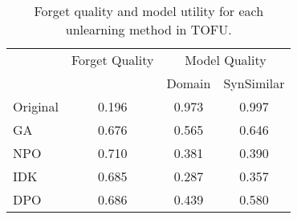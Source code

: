 \setlength{\tabcolsep}{2.5pt}
\small
\begin{table}[hbt!]
\begin{tabular}{l c c c}
\hline
 & Forget Quality & \multicolumn{2}{c}{Model Quality} \\
\cline{3-4}
 & & Domain & SynSimilar \\
\hline
Original & 0.196 & 0.973 & 0.997 \\
GA       & 0.676 & 0.565 & 0.646 \\
NPO      & 0.710 & 0.381 & 0.390 \\
IDK      & 0.685 & 0.287 & 0.357 \\
DPO      & 0.686 & 0.439 & 0.580 \\
\hline
\end{tabular}
\caption{Forget quality and model utility for each unlearning method in TOFU.}
\end{table}
